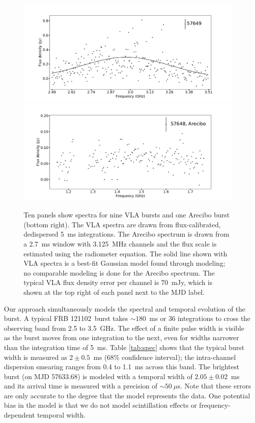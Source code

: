 \documentclass[twocolumn]{aastex61}
\newcommand{\frb}{FRB 121102}
\begin{document}
\begin{figure}[ht]
\begin{center}
 \begin{minipage}{2\columnwidth}
  \includegraphics[width=0.5\columnwidth]{spec_57649.pdf}
  \includegraphics[width=0.5\columnwidth]{specAO_57648.pdf}
 \end{minipage}
\caption{Ten panels show spectra for nine VLA bursts and one Arecibo burst (bottom right). The VLA spectra are drawn from flux-calibrated, dedispersed 5~ms integrations. The Arecibo spectrum is drawn from a 2.7~ms window with 3.125~MHz channels and the flux scale is estimated using the radiometer equation. The solid line shown with VLA spectra is a best-fit Gaussian model found through modeling; no comparable modeling is done for the Arecibo spectrum. The typical VLA flux density error per channel is 70~mJy, which is shown at the top right of each panel next to the MJD label.
\label{fig:spec}}
\end{center}
\end{figure}

Our approach simultaneously models the spectral and temporal evolution of the burst. A typical \frb\ burst takes $\sim180$~ms or 36 integrations to cross the observing band from 2.5 to 3.5~GHz. The effect of a finite pulse width is visible as the burst moves from one integration to the next, even for widths narrower than the integration time of 5~ms. Table \ref{tab:spec} shows that the typical burst width is measured as $2\pm0.5$~ms (68\% confidence interval); the intra-channel dispersion smearing ranges from 0.4 to 1.1~ms across this band. The brightest burst (on MJD 57633.68) is modeled with a temporal width of $2.05\pm0.02$~ms and its arrival time is measured with a precision of $\sim50~\mu$s. Note that these errors are only accurate to the degree that the model represents the data. One potential bias in the model is that we do not model scintillation effects or frequency-dependent temporal width.
\end{document}
